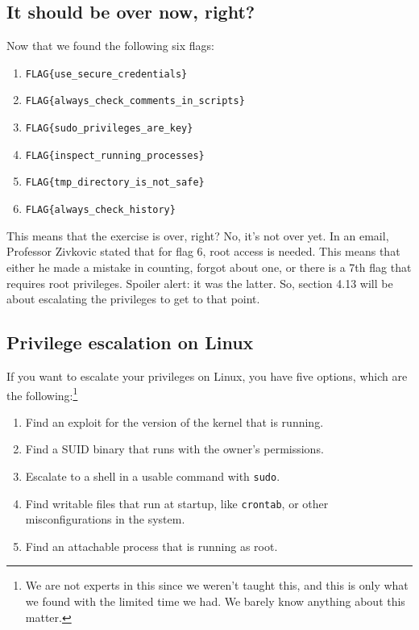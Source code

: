 \documentclass[a4paper]{article}
\newcommand{\abc}{\hfill \break}
\begin{document}
\subsection{It should be over now, right?}
Now that we found the following six flags:
\begin{enumerate}
	\item \texttt{FLAG\{use\_secure\_credentials\}}
	\item \texttt{FLAG\{always\_check\_comments\_in\_scripts\}}
	\item \texttt{FLAG\{sudo\_privileges\_are\_key\}}
	\item \texttt{FLAG\{inspect\_running\_processes\}}
	\item \texttt{FLAG\{tmp\_directory\_is\_not\_safe\}}
	\item \texttt{FLAG\{always\_check\_history\}}
\end{enumerate}
This means that the exercise is over, right?\abc
No, it's not over yet. In an email, Professor Zivkovic stated that for flag 6, root access is needed. This means that either he made a mistake in counting, forgot about one, or there is a 7th flag that requires root privileges. Spoiler alert: it was the latter. So, section 4.13 will be about escalating the privileges to get to that point.
\newpage
\subsection{Privilege escalation on Linux}
If you want to escalate your privileges on Linux, you have five options, which are the following:\footnote{We are not experts in this since we weren't taught this, and this is only what we found with the limited time we had. We barely know anything about this matter.}\cite{priv-esc-overview}
\begin{enumerate}
	\item Find an exploit for the version of the kernel that is running.\cite{kernel-exploit}
	\item Find a SUID binary that runs with the owner's permissions.\cite{suid}
	\item Escalate to a shell in a usable command with \texttt{sudo}.\cite{sudo-exploit}
	\item Find writable files that run at startup, like \texttt{crontab}, or other misconfigurations in the system.\cite{enumeration-walkthough}
	\item Find an attachable process that is running as root.
\end{enumerate}
\end{document}
